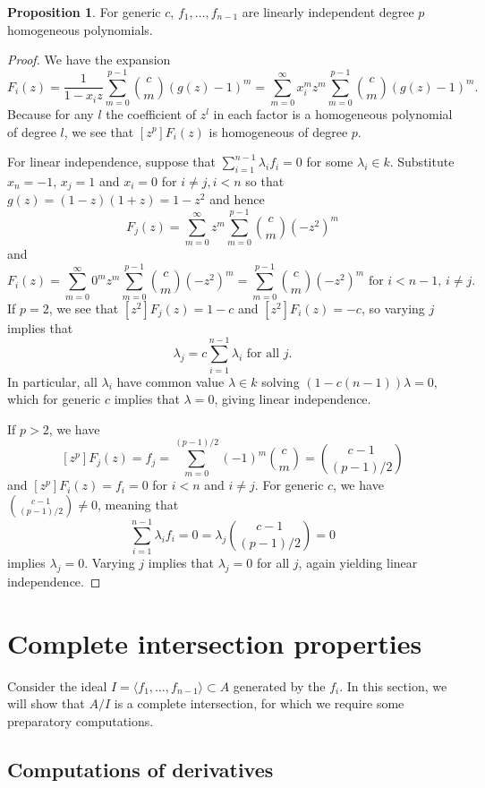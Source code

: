 \documentclass{amsart}
\numberwithin{equation}{section}
\theoremstyle{definition}
\newtheorem{proposition}[theorem]{Proposition}
\begin{document}
\begin{proposition}\label{prop:linind} 
For generic $c$, $f_1, \ldots, f_{n - 1}$ are linearly independent degree $p$ homogeneous polynomials.
\end{proposition} 
\begin{proof} 
We have the expansion
\[
F_i(z)=\frac{1}{1-x_iz}\sum_{m=0}^{p-1} \binom{c}{m} (g(z)-1)^m=\sum_{m=0}^\infty x_i^mz^m\sum_{m=0}^{p-1} \binom{c}{m} (g(z)-1)^m.
\]
Because for any $l$ the coefficient of $z^l$ in each factor is a homogeneous polynomial of degree $l$, we see that $[z^p]F_i(z)$ is homogeneous of degree $p$.

For linear independence, suppose that $\sum_{i=1}^{n-1} \lambda_if_i=0$ for some $\lambda_i \in k$.  Substitute $x_{n} = -1$, $x_j=1$ and $x_i=0$ for $i \ne j,i < n$ so that $g(z)=(1-z)(1+z)=1-z^2$ and hence
\[
F_j(z)=\sum_{m=0}^\infty z^m\sum_{m=0}^{p-1} \binom{c}{m} (-z^2)^m
\]
and 
\[
F_i(z)=\sum_{m=0}^\infty 0^mz^m\sum_{m=0}^{p-1} \binom{c}{m} (-z^2)^m=\sum_{m=0}^{p-1} \binom{c}{m} (-z^2)^m \text{ for $i < n - 1$, $i \neq j$}.
\]
If $p = 2$, we see that $[z^2]F_j(z)=1-c$ and $[z^2]F_i(z)=-c$, so varying $j$ implies that
\[
\lambda_j = c\sum_{i=1}^{n-1} \lambda_i \text{ for all }j.
\]
In particular, all $\lambda_i$ have common value $\lambda \in k$ solving $(1-c(n-1))\lambda = 0$, which for generic $c$ implies that $\lambda = 0$, giving linear independence.

If $p > 2$, we have 
\[
[z^p]F_j(z)=f_j=\sum_{m=0}^{(p-1)/2} (-1)^m\binom{c}{m}=\binom{c-1}{(p-1)/2}
\]
and $[z^p]F_i(z)=f_i=0$ for $i < n$ and $i \neq j$. For generic $c$, we have $\binom{c-1}{(p-1)/2} \ne 0$, meaning that 
\[
\sum_{i=1}^{n-1} \lambda_if_i=0 = \lambda_j\binom{c-1}{(p-1)/2}=0
\]
implies $\lambda_j=0$.  Varying $j$ implies that $\lambda_j=0$ for all $j$, again yielding linear independence.
\end{proof}

\section{Complete intersection properties}

Consider the ideal $I = \langle f_1, \ldots, f_{n - 1} \rangle \subset A$ generated by the $f_i$.  In this section, we will show that $A/I$ is a complete intersection, for which we require some preparatory computations.

\subsection{Computations of derivatives}
\end{document}

